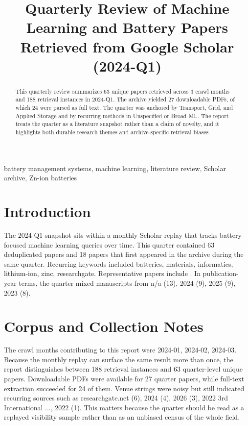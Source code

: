 \documentclass[conference]{IEEEtran}
\begin{document}
\title{ Quarterly Review of Machine Learning and Battery Papers Retrieved from Google Scholar (2024-Q1) }

\author{
}

\maketitle

\begin{abstract}
This quarterly review summarizes 63 unique papers retrieved across 3 crawl months and 188 retrieval instances in 2024-Q1. The archive yielded 27 downloadable PDFs, of which 24 were parsed as full text. The quarter was anchored by Transport, Grid, and Applied Storage and by recurring methods in Unspecified or Broad ML. The report treats the quarter as a literature snapshot rather than a claim of novelty, and it highlights both durable research themes and archive-specific retrieval biases.
\end{abstract}

\begin{IEEEkeywords}
battery management systems, machine learning, literature review, Scholar archive, Zn-ion batteries
\end{IEEEkeywords}

\section{Introduction}
The 2024-Q1 snapshot sits within a monthly Scholar replay that tracks battery-focused machine learning queries over time. This quarter contained 63 deduplicated papers and 18 papers that first appeared in the archive during the same quarter. Recurring keywords included batteries, materials, informatics, lithium-ion, zinc, researchgate. Representative papers include \cite{machinelearningdriven2025,socestimationof2023,textminingfor2022,recentadvancesin2025}. In publication-year terms, the quarter mixed manuscripts from n/a (13), 2024 (9), 2025 (9), 2023 (8).

\section{Corpus and Collection Notes}
The crawl months contributing to this report were 2024-01, 2024-02, 2024-03. Because the monthly replay can surface the same result more than once, the report distinguishes between 188 retrieval instances and 63 quarter-level unique papers. Downloadable PDFs were available for 27 quarter papers, while full-text extraction succeeded for 24 of them. Venue strings were noisy but still indicated recurring sources such as researchgate.net (6), 2024 (4), 2026 (3), 2022 3rd International ..., 2022 (1). This matters because the quarter should be read as a replayed visibility sample rather than as an unbiased census of the whole field.
\end{document}
